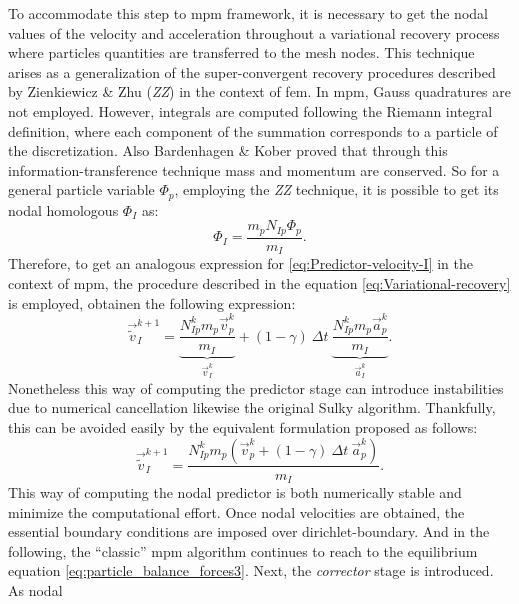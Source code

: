 \documentclass[preprint,12pt,a4paper]{elsarticle}
\begin{document}
To accommodate this step to \acrshort{mpm} framework, it is necessary to get
the nodal values of the velocity and acceleration throughout a variational
recovery process where particles quantities are transferred to the
mesh nodes. This technique arises as a generalization of the super-convergent recovery
procedures described by Zienkiewicz \& Zhu \cite{ZZ1992_I} (\textit{ZZ})
in the context of \acrshort{fem}. In \acrshort{mpm}, Gauss quadratures are not employed. However, 
integrals are computed following the Riemann integral definition,
where each component of the summation corresponds to a particle of the
discretization. Also Bardenhagen \& Kober \cite{Bardenhagen2004}
proved that through this information-transference technique mass and momentum are conserved. So for a general particle variable $\Phi_p$, employing the
\textit{ZZ} technique, it is possible to get its nodal homologous $\Phi_I$  as:
\begin{equation}
  \label{eq:Variational-recovery}
   \Phi_I = \frac{m_p N_{Ip} \Phi_p}{m_I}.
 \end{equation}
 Therefore, to get an analogous expression for
 \eqref{eq:Predictor-velocity-I} in the context of \acrshort{mpm}, the
 procedure described in the equation \eqref{eq:Variational-recovery}
 is employed, obtainen the following expression:
 \begin{equation}
   \label{eq:Predictor-velocity-II}
   \vec{\tilde{v}}_I^{k+1} = \underbrace{\frac{N_{Ip}^{k} m_p
       \vec{v}_p^k}{m_I}}_{\vec{v}_I^{k}} + (1 - \gamma)\ \Delta t\  \underbrace{\frac{N_{Ip}^{k} m_p \vec{a}_p^k}{m_I}}_{\vec{a}_I^{k}}.
 \end{equation}
Nonetheless this way of computing the predictor stage can introduce
instabilities due to numerical cancellation likewise the original
Sulky algorithm. Thankfully, this can be avoided easily by the
equivalent formulation proposed as follows: 
\begin{equation}
  \label{eq:Predictor-velocity-II}
  \vec{\tilde{v}}_I^{k+1} = \frac{ N_{Ip}^{k} m_p (\vec{v}_p^k + (1 - \gamma)\ \Delta t\ \vec{a}_p^k)}{m_I}.
\end{equation}
This way of computing the nodal predictor is both numerically stable
and minimize the computational effort. Once nodal velocities are
obtained, the essential boundary conditions are imposed over \gls{dirichlet-boundary}. And in the
following, the ``classic'' \acrshort{mpm} algorithm continues to reach to the
equilibrium equation \eqref{eq:particle_balance_forces3}. Next, the
\textit{corrector} stage is introduced. As nodal
\end{document}
